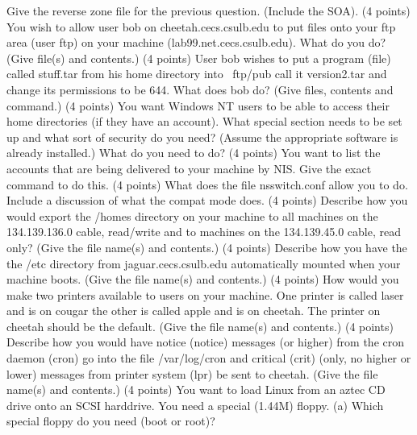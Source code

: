 Give the reverse zone file for the previous question. (Include the SOA).
\vskip 2.8in
\ques
(4 points)
You wish to allow user {\ltt{}bob} on {\ltt{}cheetah.cecs.csulb.edu}
to put files onto your ftp area (user {\ltt{}ftp}) on 
your machine ({\ltt{}lab99.net.cecs.csulb.edu}).
What do you do?
(Give file(s) and contents.)
\vskip 1.0in
\ques
(4 points)
User {\ltt{}bob} wishes to put a program (file) called 
{\ltt{}stuff.tar} from his home directory into {\ltt{}~ftp/pub}
call it {\ltt{}version2.tar} and change its permissions to
be {\ltt{}644}.
What does {\ltt{}bob} do? (Give files, contents and command.)
\vskip 1.6in
\ques
(4 points)
You want Windows NT users to be able to access their home directories
(if they have an account).
What special section needs to be set up and what sort
of security do you need?
(Assume the appropriate software is already installed.)
What do you need to do?
\vskip 1.3in
\vfill\eject
\ques
(4 points)
You want to list the accounts that are being delivered to your machine
by NIS. Give the exact command to do this.
\vskip 1.8in
\ques
(4 points)
What does the file {\ltt{}nsswitch.conf} allow you to do.
Include a discussion of what the {\ltt{}compat} mode does.
\vskip 1.0in
\ques
(4 points)
Describe how you would
export the {\ltt{}/homes} directory on your machine to all
machines on the 134.139.136.0 cable, read/write
and to machines on the 134.139.45.0 cable, read only?
(Give the file name(s) and contents.)
\vskip 1.2in
\ques
(4 points)
Describe how you have the
the {\ltt{}/etc} directory from {\ltt{}jaguar.cecs.csulb.edu}
automatically mounted when your machine boots.
(Give the file name(s) and contents.)
\vskip 1.2in
\ques
(4 points)
How would you make two printers available to users on your machine.
One printer is called {\ltt{}laser} and is on {\ltt{}cougar}
the other is called {\ltt{}apple} and is on {\ltt{}cheetah}.
The printer on {\ltt{}cheetah} should be the default.
(Give the file name(s) and contents.)
\vskip 1.0in
\vfill\eject
\ques
(4 points)
Describe how you would have
notice ({\ltt{}notice}) messages (or higher) from the cron daemon 
({\ltt{}cron})
go into the file {\ltt{}/var/log/cron}
and
critical ({\ltt{}crit}) (only, no higher or lower)
messages from printer system ({\ltt{}lpr}) be sent to {\ltt{}cheetah}.
(Give the file name(s) and contents.)
\vskip 1.5in
\ques
(4 points)
You want to load Linux from an aztec CD drive onto an SCSI harddrive.
You need a special (1.44M) floppy.
(a) Which special floppy do you need (boot or root)?
